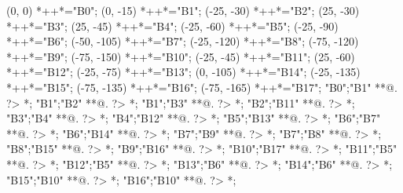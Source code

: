 \documentclass[portrait]{article}
\begin{document}
\begin{scriptsize}
\xy(0, 0)
	*++{}*\frm{-,}="B0";
(0, -15)
	*++{}*\frm{-,}="B1";
(-25, -30)
	*++{}*\frm{-,}="B2";
(25, -30)
	*++{}*\frm{-,}="B3";
(25, -45)
	*++{}*\frm{-,}="B4";
(-25, -60)
	*++{}*\frm{-,}="B5";
(-25, -90)
	*++{}*\frm{-,}="B6";
(-50, -105)
	*++{}*\frm{-,}="B7";
(-25, -120)
	*++{}*\frm{-,}="B8";
(-75, -120)
	*++{}*\frm{-,}="B9";
(-75, -150)
	*++{}*\frm{-,}="B10";
(-25, -45)
	*++{}*\frm{-,}="B11";
(25, -60)
	*++{}*\frm{-,}="B12";
(-25, -75)
	*++{}*\frm{-,}="B13";
(0, -105)
	*++{}*\frm{-,}="B14";
(-25, -135)
	*++{}*\frm{-,}="B15";
(-75, -135)
	*++{}*\frm{-,}="B16";
(-75, -165)
	*++{}*\frm{-,}="B17";
"B0";"B1" **@{.} ?> *{\dir{>}};
"B1";"B2" **@{.} ?> *{\dir{>}};
"B1";"B3" **@{.} ?> *{\dir{>}};
"B2";"B11" **@{.} ?> *{\dir{>}};
"B3";"B4" **@{.} ?> *{\dir{>}};
"B4";"B12" **@{.} ?> *{\dir{>}};
"B5";"B13" **@{.} ?> *{\dir{>}};
"B6";"B7" **@{.} ?> *{\dir{>}};
"B6";"B14" **@{.} ?> *{\dir{>}};
"B7";"B9" **@{.} ?> *{\dir{>}};
"B7";"B8" **@{.} ?> *{\dir{>}};
"B8";"B15" **@{.} ?> *{\dir{>}};
"B9";"B16" **@{.} ?> *{\dir{>}};
"B10";"B17" **@{.} ?> *{\dir{>}};
"B11";"B5" **@{.} ?> *{\dir{>}};
"B12";"B5" **@{.} ?> *{\dir{>}};
"B13";"B6" **@{.} ?> *{\dir{>}};
"B14";"B6" **@{.} ?> *{\dir{>}};
"B15";"B10" **@{.} ?> *{\dir{>}};
"B16";"B10" **@{.} ?> *{\dir{>}};
\endxy
\end{scriptsize}
\end{document}
